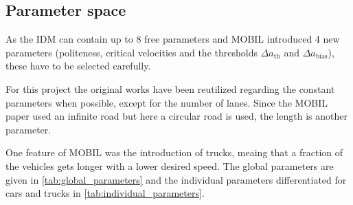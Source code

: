 \subsection{Parameter space}
\label{sec:parameters}
As the IDM can contain up to 8 free parameters and MOBIL introduced 4 new parameters (politeness,
critical velocities and the thresholds $\Delta a_\text{th}$ and $\Delta a_\text{bias}$), these have
to be selected carefully. 

For this project the original works have been reutilized regarding the constant parameters when
possible, except for the number of lanes. Since the MOBIL paper used an infinite road but here a 
circular road is used, the length is another parameter. 

One feature of MOBIL was the introduction of trucks, meaing that a fraction of the vehicles gets
longer with a lower desired speed. The global parameters are given in
\autoref{tab:global_parameters} and the individual parameters differentiated for cars and trucks in
\autoref{tab:individual_parameters}.
